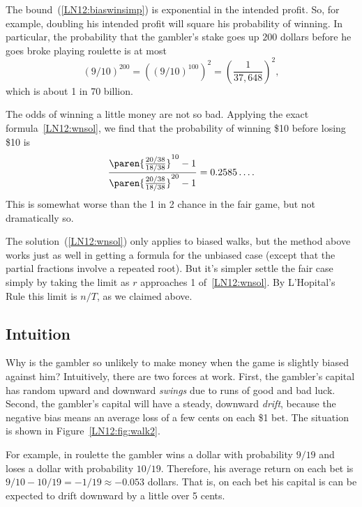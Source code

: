 The bound~(\ref{LN12:biaswinsimp}) is exponential in the intended profit.  So,
for example, doubling his intended profit will square his probability of
winning.  In particular, the probability that the gambler's stake goes up
$200$ dollars before he goes broke playing roulette is at most
\[
(9/10)^{200} = ((9/10)^{100})^2 = \left(\frac{1}{37,648}\right)^2,
\]
which is about 1 in 70 billion.

\begin{staffnotes}

The odds of winning a little money are not so bad.
Applying the exact formula~\eqref{LN12:wnsol}, we find that the probability
of winning \$10 before losing \$10 is
\[
\frac{\paren{\frac{20/38}{18/38}}^{10} - 1}
              {\paren{\frac{20/38}{18/38}}^{20} - 1}
  = 0.2585\dots.
\]
This is somewhat worse than the 1 in 2 chance in the fair game, but not
dramatically so.

\end{staffnotes}

The solution~(\ref{LN12:wnsol}) only applies to biased walks, but the method
above works just as well in getting a formula for the unbiased case
(except that the partial fractions involve a repeated root).  But it's
simpler settle the fair case simply by taking the limit as $r$
approaches 1 of~\eqref{LN12:wnsol}.  By L'Hopital's Rule this limit is $n/T$,
as we claimed above.

\subsection{Intuition}

Why is the gambler so unlikely to make money when the game is slightly
biased against him?  Intuitively, there are two forces at work.  First,
the gambler's capital has random upward and downward {\em swings} due to
runs of good and bad luck.  Second, the gambler's capital will have a
steady, downward {\em drift}, because the negative bias means an average
loss of a few cents on each \$1 bet.  The situation is shown in
Figure~\ref{LN12:fig:walk2}.

\begin{staffnotes}

For example, in roulette the gambler wins a dollar with probability $9/19$
and loses a dollar with probability $10/19$.  Therefore, his average
return on each bet is $9/10 - 10/19 = - 1/19 \approx -0.053$ dollars.
That is, on each bet his capital is can be expected to drift downward by a
little over 5 cents.

\end{staffnotes}

